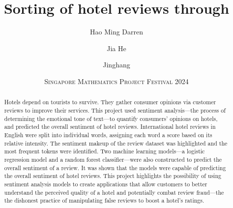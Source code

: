 \documentclass[12pt, a4paper]{pancake-article}
\title{Sorting \tint{sentiments} of hotel reviews through
\tint{machine learning}}
\author{\tint{Yap} Hao Ming Darren \and \tint{Tan} Jia He \and
\tint{Fu} Jinghang}
\date{\scshape Singapore Mathematics Project Festival 2024}
\begin{document}
\maketitle
\begin{abstract}
  Hotels depend on tourists to survive. They gather consumer opinions
  via customer
  reviews to improve their services. This project used sentiment analysis---the
  process of determining the emotional tone of text---to quantify consumers'
  opinions on hotels, and predicted the overall sentiment of hotel reviews.
  International hotel reviews in English were split into individual words,
  assigning each word a score based on its relative intensity. The sentiment
  makeup of the review dataset was highlighted and the most frequent tokens were
  identified. Two machine learning models---a logistic regression
  model and a random
  forest classifier---were also constructed to predict the overall
  sentiment of a
  review. It was shown that the models were capable of predicting the overall
  sentiment of hotel reviews. This project highlights the possibility of using
  sentiment analysis models to create applications that allow
  customers to better
  understand the perceived quality of a hotel and potentially combat
  review fraud---the
  the dishonest practice of manipulating false reviews to boost a
  hotel's ratings.
\end{abstract}
\end{document}
